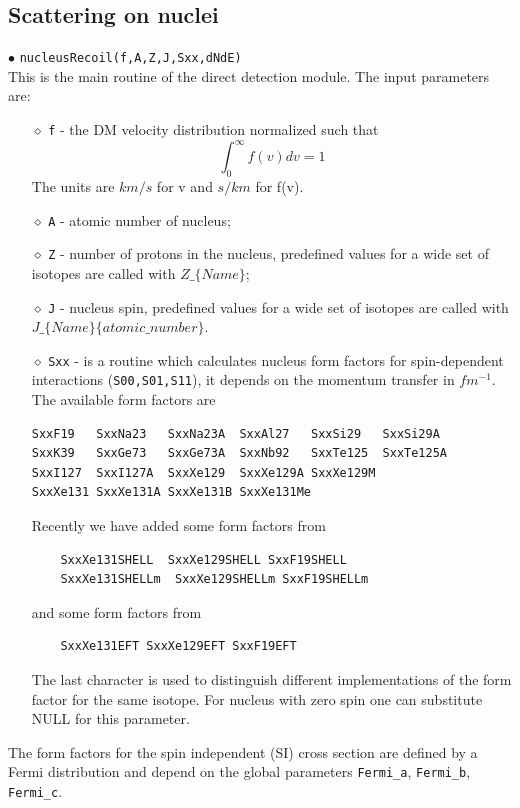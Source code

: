 \documentclass[12pt,a4paper]{article}
\begin{document}
\subsection{Scattering on nuclei}
\label{DDforNucleus}
$\bullet$ \verb|nucleusRecoil(f,A,Z,J,Sxx,dNdE)|\\
This is the main routine of the  direct detection module. The
input parameters are:
\begin{itemize}
\item[$\diamond$]
\verb|f| -  the DM velocity distribution   normalized such that 
\begin{equation}
\label{v_norm} 
\int_0^{\infty} f(v) dv =1
\end{equation} 
The units  are $km/s$ for v and $s/km$ for  f(v).
\item[$\diamond$]
\verb|A| - atomic number of nucleus;
\item[$\diamond$]
\verb|Z| - number of protons in the nucleus, predefined values for a wide set of isotopes 
are called with $Z\_\{Name\}$;
\item[$\diamond$]
\verb|J| - nucleus spin,  predefined values for a wide set of isotopes
are called with\\
 $J\_\{Name\}\{atomic\_number\}$.
\item[$\diamond$]
\verb|Sxx| - is a routine which calculates nucleus form factors for
spin-dependent interactions (\verb|S00,S01,S11|), it depends  on the momentum
transfer in $fm^{-1}$. The available form factors are \cite{Belanger:2008sj}
\begin{verbatim}
SxxF19   SxxNa23   SxxNa23A  SxxAl27   SxxSi29   SxxSi29A  
SxxK39   SxxGe73   SxxGe73A  SxxNb92   SxxTe125  SxxTe125A 
SxxI127  SxxI127A  SxxXe129  SxxXe129A SxxXe129M 
SxxXe131 SxxXe131A SxxXe131B SxxXe131Me 
\end{verbatim}

Recently we have added some form factors from \cite{Fitzpatrick:2012ix}
\begin{verbatim}
    SxxXe131SHELL  SxxXe129SHELL SxxF19SHELL 
    SxxXe131SHELLm  SxxXe129SHELLm SxxF19SHELLm
\end{verbatim}
and some form factors from \cite{Klos:2013rwa}
\begin{verbatim}
    SxxXe131EFT SxxXe129EFT SxxF19EFT 
\end{verbatim}

The last character is used to distinguish different implementations of
the form factor for the same isotope.
For nucleus with zero spin one can substitute NULL for this parameter. 
\end{itemize}
The form factors for the spin independent (SI) cross section are defined by a Fermi distribution
and depend on the global parameters \verb|Fermi_a|, \verb|Fermi_b|,
\verb|Fermi_c|. 
\end{document}
